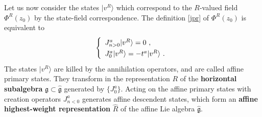 \documentclass[12pt, a4paper, notitlepage, twoside]{report}
\numberwithin{equation}{section}
\theoremstyle{break}
\begin{document}
Let us now consider the states $|v^R\rangle$ which correspond to the $R$-valued field $\Phi^R(z_0)$ by the state-field correspondence.
The definition \eqref{jpr} of $\Phi^R(z_0)$ is equivalent to 
\begin{align}
\renewcommand{\arraystretch}{1.3}
 \left\{\begin{array}{l}  J^a_{n>0}|v^R\rangle = 0 \ ,  \\ J^a_0|v^R\rangle = -t^a |v^R\rangle\ . \end{array}\right. 
\end{align}
The states $|v^R\rangle$ are killed by the annihilation operators, and are called affine primary states.
They transform in the representation $R$ of the \textbf{\boldmath horizontal subalgebra} $\mathfrak{g}\subset \hat{\mathfrak{g}}$ generated by $\{J^a_0\}$.
Acting on the affine primary states with creation operators $J^a_{n<0}$ generates affine descendent states, which form an \textbf{\boldmath affine highest-weight representation} $\hat{R}$ of the affine Lie algebra $\hat{\mathfrak{g}}$.
\end{document}
